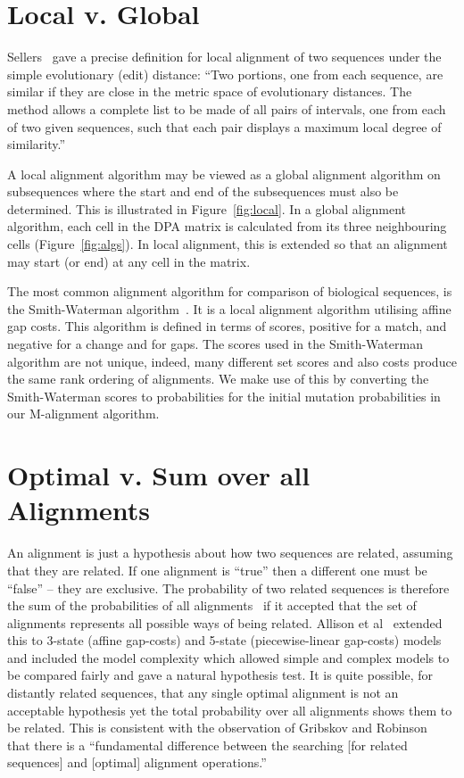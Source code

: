 \documentclass[letterpaper,11pt,oneside]{article}
\begin{document}
\section{Local v. Global}

Sellers~\cite{sellers80} gave a precise definition for local alignment
of two sequences under the simple evolutionary (edit) distance:
``Two portions, one from each sequence, are similar if they are close
in the metric space of evolutionary distances. The method allows
a complete list to be made of all pairs of intervals,
one from each of two given sequences, such that each pair
displays a maximum local degree of similarity.''

A local alignment algorithm may be viewed as a global alignment algorithm on
subsequences where the start and end of the subsequences must also be determined.
This is illustrated in Figure~\ref{fig:local}.  In a global alignment
algorithm, each cell in the DPA matrix is calculated from its three
neighbouring cells (Figure~\ref{fig:algs}). In local alignment, this is
extended so that an alignment may start (or end) at any cell in the matrix.

The most common alignment algorithm for comparison of biological sequences, is
the Smith-Waterman algorithm~\cite{smith81}.  It is a local alignment
algorithm utilising affine gap costs.  This algorithm is defined in terms of
scores, positive for a match, and negative for a change and for gaps.  The
scores used in the Smith-Waterman algorithm are not unique, indeed, many
different set scores and also costs produce the same rank ordering of
alignments.  We make use of this by converting the Smith-Waterman scores to
probabilities for the initial mutation probabilities in our M-alignment
algorithm.


\section{Optimal v. Sum over all Alignments}

An alignment is just a hypothesis about how two sequences are related,
assuming that they are related.  If one alignment is ``true'' then
a different one must be ``false'' -- they are exclusive.
The probability of two related sequences is therefore the sum of
the probabilities of all alignments~\cite{bishop86}
if it accepted that the set of alignments represents all
possible ways of being related.
Allison et al~\cite{allison92a} extended this to 3-state (affine gap-costs)
and 5-state (piecewise-linear gap-costs) models and included
the model complexity which allowed simple and complex
models to be compared fairly and gave a natural hypothesis test.
It is quite possible, for distantly related sequences, that any single
optimal alignment is not an acceptable hypothesis yet the total probability
over all alignments shows them to be related.
This is consistent with the observation of
Gribskov and Robinson~\cite{gribskov96} that there is
a ``fundamental difference between the searching [for related sequences]
and [optimal] alignment operations.''
\end{document}
